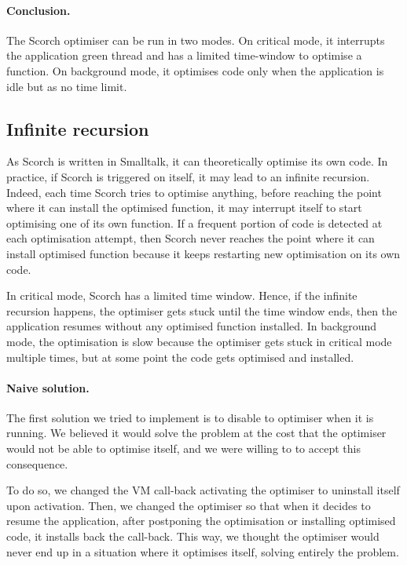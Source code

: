 \documentclass[a4paper,12pt,twoside]{../includes/ThesisStyle}
\begin{document}
\paragraph{Conclusion.} The Scorch optimiser can be run in two modes. On critical mode, it interrupts the application green thread and has a limited time-window to optimise a function. On background mode, it optimises code only when the application is idle but as no time limit. 

\subsection{Infinite recursion}

As Scorch is written in Smalltalk, it can theoretically optimise its own code. In practice, if Scorch is triggered on itself, it may lead to an infinite recursion. Indeed, each time Scorch tries to optimise anything, before reaching the point where it can install the optimised function, it may interrupt itself to start optimising one of its own function. If a frequent portion of code is detected at each optimisation attempt, then Scorch never reaches the point where it can install optimised function because it keeps restarting new optimisation on its own code.

In critical mode, Scorch has a limited time window. Hence, if the infinite recursion happens, the optimiser gets stuck until the time window ends, then the application resumes without any optimised function installed. In background mode, the optimisation is slow because the optimiser gets stuck in critical mode multiple times, but at some point the code gets optimised and installed.


\paragraph{Naive solution.} The first solution we tried to implement is to disable to optimiser when it is running. We believed it would solve the problem at the cost that the optimiser would not be able to optimise itself, and we were willing to to accept this consequence.

To do so, we changed the VM call-back activating the optimiser to uninstall itself upon activation. Then, we changed the optimiser so that when it decides to resume the application, after postponing the optimisation or installing optimised code, it installs back the call-back. This way, we thought the optimiser would never end up in a situation where it optimises itself, solving entirely the problem.
\end{document}
